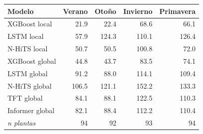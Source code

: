 \begin{tabular}{lrrrr}
\toprule
Modelo & Verano & Otoño & Invierno & Primavera \\
\midrule
XGBoost local & 21.9 & 22.4 & 68.6 & 66.1 \\
LSTM local & 57.9 & 124.3 & 110.1 & 126.4 \\
N-HiTS local & 50.7 & 50.5 & 100.8 & 72.0 \\
XGBoost global & 44.8 & 43.7 & 83.5 & 74.1 \\
LSTM global & 91.2 & 88.0 & 114.1 & 109.4 \\
N-HiTS global & 106.5 & 121.1 & 152.2 & 133.3 \\
TFT global & 84.1 & 88.1 & 122.5 & 110.3 \\
Informer global & 82.1 & 88.4 & 112.2 & 110.4 \\
\midrule
\textit{n plantas} & 94 & 92 & 93 & 94 \\
\bottomrule
\end{tabular}
